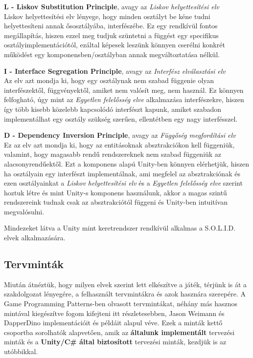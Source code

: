 \textbf{L - Liskov Substitution Principle}, avagy az \textit{Liskov helyettesítési elv}\\
Liskov helyettesítési elv lényege, hogy minden osztályt be kéne tudni helyettesíteni annak ősosztályába, interfészébe. Ez egy rendkívül fontos megállapítás, hiszen ezzel meg tudjuk szüntetni a függést egy specifikus osztályimplementációtól, ezáltal képesek leszünk könnyen cserélni konkrét működést egy komponensben/osztályban annak megváltoztatása nélkül.

\textbf{I - Interface Segregation Principle}, avagy az \textit{Interfész elválasztási elv}\\
Az elv azt mondja ki, hogy egy osztálynak nem szabad függenie olyan interfészektől, függvényektől, amiket nem valósít meg, nem használ. Ez könnyen felfogható, úgy mint az \textit{Egyetlen felelősség elve} alkalmazása interfészekre, hiszen így több kisebb közelebb kapcsolódó interfészt kapunk, amiket szabadon implementálhat egy osztály szükség szerűen, ellentétben egy nagy interfésszel.

\textbf{D - Dependency Inversion Principle}, avagy az \textit{Függőség megfordítási elv}\\
Ez az elv azt mondja ki, hogy az entitásoknak absztrakciókon kell függeniük, valamint, hogy magasabb rendű rendszereknek nem szabad függeniük az alacsonyrendűektől. Ezt a komponens alapú Unity-ben könnyen elérhetjük, hiszen ha osztályain egy interfészt implementálnak, ami megfelel az absztrakciónak és ezen osztályainkat a \textit{Liskov helyettesítési elv} és a \textit{Egyetlen felelősség elve} szerint hoztuk létre és mint Unity-s komponens használunk, akkor a magas szintű rendszereink tudnak csak az absztrakciótól függeni és Unity-ben intuitívan megvalósulni.

Mindezeket látva a Unity mint keretrendszer rendkívül alkalmas a S.O.L.I.D. elvek alkalmazására.

\subsection{Tervminták}
Miután átnéztük, hogy milyen elvek szerint lett elkészítve a játék, térjünk is át a szakdolgozat lényegére, a felhasznált tervmintákra és azok hasznára szerepére. A Game Programming Patterns-ben\cite{gameProgrammingPatterns} olvasott tervmintákat, néhány más hasznos mintával kiegészítve fogom kifejteni itt részletesebben, Jason Weimann\cite{jason} és DapperDino\cite{dapperDino} implementációit és példáit alapul véve. Ezek a minták kettő csoportba sorolhatók alapvetően, amik az \textbf{általunk implementált} tervezési minták és a \textbf{Unity/C\# által biztosított} tervezési minták, kezdjük is az utóbbikkal.

